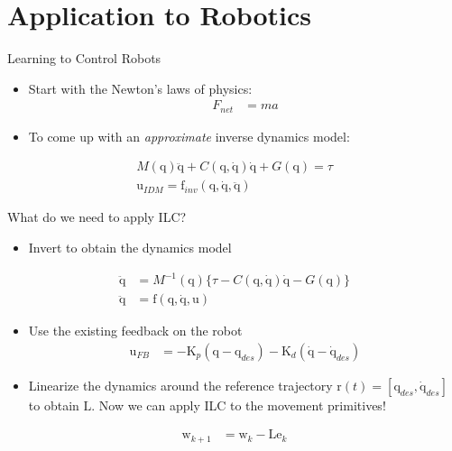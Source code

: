 \documentclass[handout]{beamer}
\newcommand{\boldvec}[1]{\boldsymbol{\mathrm{#1}}}
\let\vec\boldvec
\newcommand{\joint}{\vec{q}} %
\newcommand{\error}{\vec{e}} %
\newcommand{\traj}{\vec{r}} %
\newcommand{\sysInput}{\vec{u}} %
\newcommand{\weights}{\vec{w}} %
\newcommand{\lmatrix}{\vec{L}} %
\begin{document}
\section{Application to Robotics}
%
\begin{frame}{Learning to Control Robots}
\begin{itemize}
\item Start with the Newton's laws of physics:
\begin{equation*}
\begin{aligned}
F_{net} &= ma
\end{aligned}
\end{equation*}
\item To come up with an \emph{approximate} inverse dynamics model:
\end{itemize}
\begin{equation*}
\begin{aligned}
M(\joint)\ddot{\joint} + C(\joint,\dot{\joint})\dot{\joint} + G(\joint) = \tau \\
\sysInput_{IDM} = \vec{f}_{inv}(\joint,\dot{\joint},\ddot{\joint})
\end{aligned}
\end{equation*}
\end{frame}
%
\begin{frame}{What do we need to apply ILC?}
\begin{itemize}
\item Invert to obtain the dynamics model
\end{itemize}
\begin{equation*}
\begin{aligned}
\ddot{\joint} &= M^{-1}(\joint)\{ \tau - C(\joint,\dot{\joint})\dot{\joint} - G(\joint) \}\\
\ddot{\joint} &= \vec{f}(\joint,\dot{\joint},\sysInput)
\end{aligned}
\end{equation*}
\begin{itemize}
\item Use the existing feedback on the robot
\begin{equation*}
\begin{aligned}
\sysInput_{FB} &= -\vec{K}_{p}(\joint - \joint_{des}) - \vec{K}_{d}(\dot{\joint} - \dot{\joint}_{des})
\end{aligned}
\end{equation*}
\item Linearize the dynamics around the reference trajectory $\traj(t) = [\joint_{des}, \dot{\joint}_{des}]$ to obtain $\lmatrix$. Now we can apply ILC to the movement primitives!
\end{itemize}
\begin{equation*}
\begin{aligned}
\weights_{k+1} &= \weights_{k} - \lmatrix\error_{k}
\end{aligned}
\end{equation*}
\end{frame}
\end{document}
